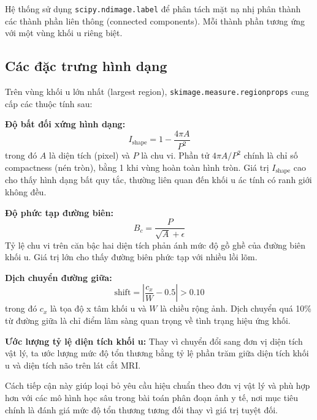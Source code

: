 Hệ thống sử dụng \texttt{scipy.ndimage.label} để phân tách mặt nạ nhị phân thành các thành phần liên thông (connected components). Mỗi thành phần tương ứng với một vùng khối u riêng biệt.

\subsection{Các đặc trưng hình dạng}

\begin{sloppypar}
Trên vùng khối u lớn nhất (largest region), \texttt{skimage.measure.regionprops} cung cấp các thuộc tính sau:
\end{sloppypar}

\textbf{Độ bất đối xứng hình dạng:}
\begin{equation}
    I_{\text{shape}} = 1 - \frac{4\pi A}{P^2}
    \label{eq:irregularity}
\end{equation}
trong đó $A$ là diện tích (pixel) và $P$ là chu vi. Phần tử $4\pi A / P^2$ chính là chỉ số compactness (nén tròn), bằng 1 khi vùng hoàn toàn hình tròn. Giá trị $I_{\text{shape}}$ cao cho thấy hình dạng bất quy tắc, thường liên quan đến khối u ác tính có ranh giới không đều.

\textbf{Độ phức tạp đường biên:}
\begin{equation}
    B_c = \frac{P}{\sqrt{A} + \epsilon}
    \label{eq:boundary}
\end{equation}
Tỷ lệ chu vi trên căn bậc hai diện tích phản ánh mức độ gồ ghề của đường biên khối u. Giá trị lớn cho thấy đường biên phức tạp với nhiều lồi lõm.

\textbf{Dịch chuyển đường giữa:}
\begin{equation}
    \text{shift} = \left| \frac{c_x}{W} - 0.5 \right| > 0.10
    \label{eq:midline}
\end{equation}
trong đó $c_x$ là tọa độ x tâm khối u và $W$ là chiều rộng ảnh. Dịch chuyển quá 10\% từ đường giữa là chỉ điểm lâm sàng quan trọng về tình trạng hiệu ứng khối.

\textbf{Ước lượng tỷ lệ diện tích khối u:}
Thay vì chuyển đổi sang đơn vị diện tích vật lý, ta ước lượng mức độ tổn thương bằng tỷ lệ phần trăm giữa diện tích khối u và diện tích não trên lát cắt MRI.

Cách tiếp cận này giúp loại bỏ yêu cầu hiệu chuẩn theo đơn vị vật lý và phù hợp hơn với các mô hình học sâu trong bài toán phân đoạn ảnh y tế, nơi mục tiêu chính là đánh giá mức độ tổn thương tương đối thay vì giá trị tuyệt đối.

